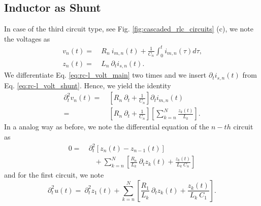 \subsection{Inductor as Shunt}
In case of the third circuit type, see Fig. \ref{fig:cascaded_rlc_circuits} (c), we note the voltages as 
\begin{align}
	v_{n}(t) =&~ R_n ~ i_{m,n}(t) + \frac{1}{C_{n}} \int_{0}^{t} i_{m,n}(\tau) d\tau \text{,} \label{eq:rc-l_volt_main}  \\ 
	z_{n}(t) =&~ L_n ~ \partial_{t} i_{s,n}(t) \text{.} \label{eq:rc-l_volt_shunt}
\end{align}
We differentiate Eq. \eqref{eq:rc-l_volt_main} two times and we insert $\partial_{t} i_{s,n}(t)$ from Eq. \eqref{eq:rc-l_volt_shunt}. Hence, we yield the identity
\begin{align*}
	\partial_{t}^2 v_{n}(t) =&~ \left[R_n ~ \partial_{t} + \frac{1}{C_{n}} \right] \partial_{t}  i_{m,n}(t) \\
	=&~ \left[R_n ~ \partial_{t} + \frac{1}{C_{n}} \right]  \left[ \sum_{k=n}^{N} \frac{z_{k}(t)}{L_{k}}  \right] \text{.}
\end{align*}
In a analog way as before, we note the differential equation of the $n-th$ circuit as
\begin{align}
	0 =&~  \partial_{t}^2 \left[z_{n}(t) - z_{n-1}(t)\right] \nonumber \\
	&\quad + \sum_{k=n}^{N} \left[ \frac{R_{n}}{L_{k}}~\partial_{t} z_{k}(t) + \frac{z_{k}(t)}{L_{k}~C_{n}} \right] \label{eq:rc-l_shunt_ode_n}
\end{align}
and for the first circuit, we note
\begin{equation}
	\partial_{t}^2 u(t) =~  \partial_{t}^2 z_{1}(t) + \sum_{k=n}^{N} \left[ \frac{R_{1}}{L_{k}}~\partial_{t} z_{k}(t) + \frac{z_{k}(t)}{L_{k}~C_{1}} \right] \text{.} \label{eq:rc-l_shunt_ode_0}
\end{equation}

